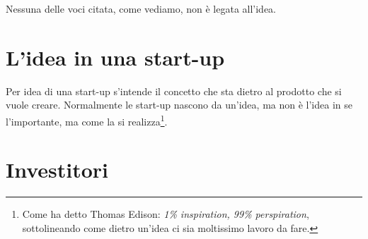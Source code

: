 

Nessuna delle voci citata, come vediamo, non è legata all'idea.

\section{L'idea in una start-up}

Per idea di una start-up s'intende il concetto che sta dietro al prodotto che
si vuole creare. Normalmente le start-up nascono da un'idea, ma non è l'idea in
se l'importante, ma come la si realizza\footnote{Come ha detto Thomas Edison:
\emph{1\% inspiration, 99\% perspiration}, sottolineando come dietro un'idea
ci sia moltissimo lavoro da fare.}.

\section{Investitori}

